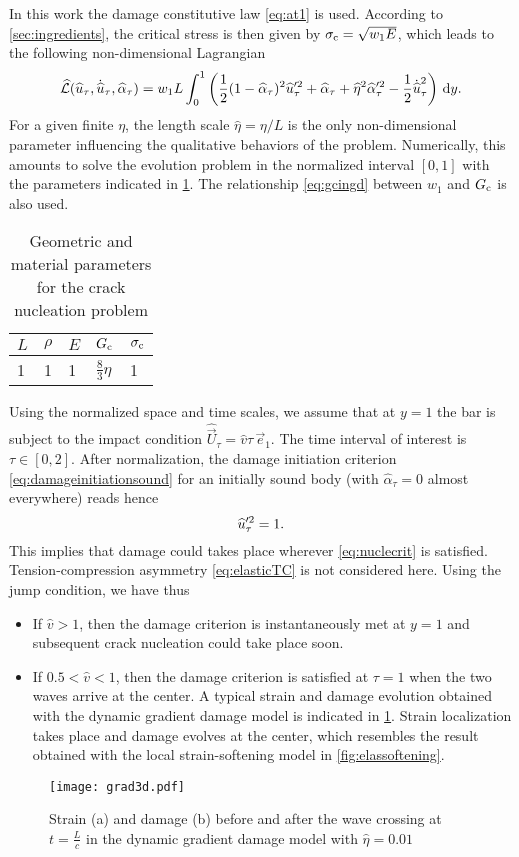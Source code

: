 In this work the damage constitutive law \eqref{eq:at1} is used. According to \cref{sec:ingredients}, the critical stress is then given by $\sigma_{\mathrm{c}}=\sqrt{w_1E}$, which leads to the following non-dimensional Lagrangian
\begin{equation} \label{eq:nondimensionalL}
\widehat{\mathcal{L}}(\widehat{u}_\tau,\dot{\widehat{u}}_\tau,\widehat{\alpha}_\tau)=w_1L\int_0^1\left(\frac{1}{2}(1-\widehat{\alpha}_\tau)^2\widehat{u}_\tau'^2+\widehat{\alpha}_\tau+\widehat{\eta}^2\widehat{\alpha}_\tau'^2-\frac{1}{2}\dot{\widehat{u}}_\tau^2\right)\,\mathrm{d}y.
\end{equation}
For a given finite $\eta$, the length scale $\widehat{\eta}=\eta/L$ is the only non-dimensional parameter influencing the qualitative behaviors of the problem. Numerically, this amounts to solve the evolution problem in the normalized interval $[0,1]$ with the parameters indicated in \cref{tab:para1d}. The relationship \eqref{eq:gcingd} between $w_1$ and $G_\mathrm{c}$ is also used.
\begin{table}[htbp]
\centering
\caption{Geometric and material parameters for the crack nucleation problem} \label{tab:para1d}
\begin{tabular}{lllll} \toprule
$L$ & $\rho$ & $E$ & $G_\mathrm{c}$ & $\sigma_{\mathrm{c}}$ \\ \midrule
1 & 1 & 1 & $\frac{8}{3}\eta$ & 1 \\ \bottomrule
\end{tabular}
\end{table}

Using the normalized space and time scales, we assume that at $y=1$ the bar is subject to the impact condition $\widehat{\vec{U}}_\tau=\widehat{v}\tau\,\vec{e}_1$. The time interval of interest is $\tau\in[0,2]$. After normalization, the damage initiation criterion \eqref{eq:damageinitiationsound} for an initially sound body (with $\widehat{\alpha}_\tau=0$ almost everywhere) reads hence
\begin{equation} \label{eq:nuclecrit}
\widehat{u}_\tau'^2=1.
\end{equation}
This implies that damage could takes place wherever \eqref{eq:nuclecrit} is satisfied. Tension-compression asymmetry \eqref{eq:elasticTC} is not considered here. Using the jump condition, we have thus
\begin{itemize}
\item If $\widehat{v}>1$, then the damage criterion is instantaneously met at $y=1$ and subsequent crack nucleation could take place soon.
\item If $0.5<\widehat{v}<1$, then the damage criterion is satisfied at $\tau=1$ when the two waves arrive at the center. A typical strain and damage evolution obtained with the dynamic gradient damage model is indicated in \cref{fig:grad3d}. Strain localization takes place and damage evolves at the center, which resembles the result obtained with the local strain-softening model in \cref{fig:elassoftening}.
\end{itemize}
\begin{figure}[htbp]
\centering
\texttt{[image: grad3d.pdf]}
\caption{Strain (a) and damage (b) before and after the wave crossing at $t=\frac{L}{c}$ in the dynamic gradient damage model with $\widehat{\eta}=0.01$} \label{fig:grad3d}
\end{figure}

